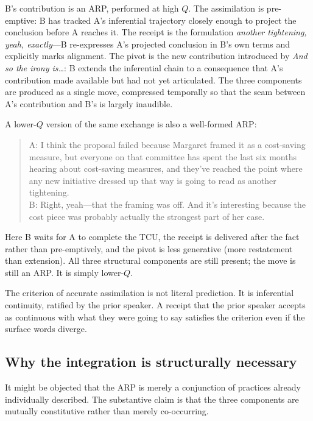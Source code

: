 B's contribution is an ARP, performed at high $Q$. The assimilation is pre-emptive: B has tracked A's inferential trajectory closely enough to project the conclusion before A reaches it. The receipt is the formulation \emph{another tightening, yeah, exactly}---B re-expresses A's projected conclusion in B's own terms and explicitly marks alignment. The pivot is the new contribution introduced by \emph{And so the irony is\ldots}: B extends the inferential chain to a consequence that A's contribution made available but had not yet articulated. The three components are produced as a single move, compressed temporally so that the seam between A's contribution and B's is largely inaudible.

A lower-$Q$ version of the same exchange is also a well-formed ARP:

\begin{quote}
A: I think the proposal failed because Margaret framed it as a cost-saving measure, but everyone on that committee has spent the last six months hearing about cost-saving measures, and they've reached the point where any new initiative dressed up that way is going to read as another tightening.\\
B: Right, yeah---that the framing was off. And it's interesting because the cost piece was probably actually the strongest part of her case.
\end{quote}

Here B waits for A to complete the TCU, the receipt is delivered after the fact rather than pre-emptively, and the pivot is less generative (more restatement than extension). All three structural components are still present; the move is still an ARP. It is simply lower-$Q$.

The criterion of accurate assimilation is not literal prediction. It is inferential continuity, ratified by the prior speaker. A receipt that the prior speaker accepts as continuous with what they were going to say satisfies the criterion even if the surface words diverge.

\subsection{Why the integration is structurally necessary}\label{sec:nontrivial}

It might be objected that the ARP is merely a conjunction of practices already individually described. The substantive claim is that the three components are mutually constitutive rather than merely co-occurring.

